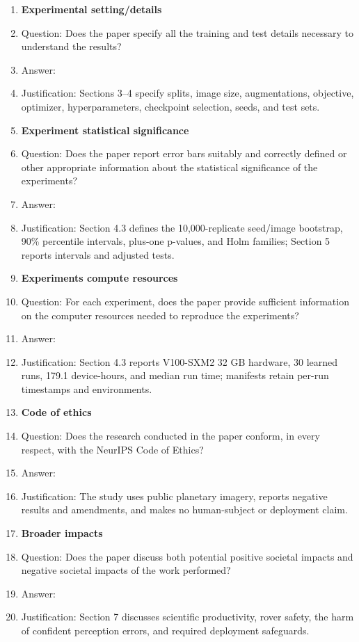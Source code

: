 \begin{enumerate}
\item \textbf{Experimental setting/details}
  \item[] Question: Does the paper specify all the training and test details necessary to understand the results?
  \item[] Answer: \answerYes{}
  \item[] Justification: Sections 3--4 specify splits, image size, augmentations, objective, optimizer, hyperparameters, checkpoint selection, seeds, and test sets.

\item \textbf{Experiment statistical significance}
  \item[] Question: Does the paper report error bars suitably and correctly defined or other appropriate information about the statistical significance of the experiments?
  \item[] Answer: \answerYes{}
  \item[] Justification: Section 4.3 defines the 10,000-replicate seed/image bootstrap, 90\% percentile intervals, plus-one p-values, and Holm families; Section 5 reports intervals and adjusted tests.

\item \textbf{Experiments compute resources}
  \item[] Question: For each experiment, does the paper provide sufficient information on the computer resources needed to reproduce the experiments?
  \item[] Answer: \answerYes{}
  \item[] Justification: Section 4.3 reports V100-SXM2 32 GB hardware, 30 learned runs, 179.1 device-hours, and median run time; manifests retain per-run timestamps and environments.

\item \textbf{Code of ethics}
  \item[] Question: Does the research conducted in the paper conform, in every respect, with the NeurIPS Code of Ethics?
  \item[] Answer: \answerYes{}
  \item[] Justification: The study uses public planetary imagery, reports negative results and amendments, and makes no human-subject or deployment claim.

\item \textbf{Broader impacts}
  \item[] Question: Does the paper discuss both potential positive societal impacts and negative societal impacts of the work performed?
  \item[] Answer: \answerYes{}
  \item[] Justification: Section 7 discusses scientific productivity, rover safety, the harm of confident perception errors, and required deployment safeguards.


\end{enumerate}
